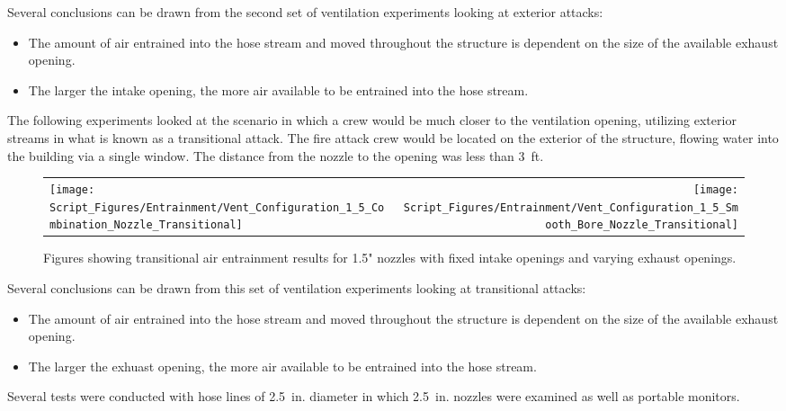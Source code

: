 \documentclass{article}
\begin{document}
Several conclusions can be drawn from the second set of ventilation experiments looking at exterior attacks:

\begin{itemize}
	\item The amount of air entrained into the hose stream and moved throughout the structure is dependent on the size of the available exhaust opening.
	\item The larger the intake opening, the more air available to be entrained into the hose stream.
\end{itemize}

\clearpage

The following experiments looked at the scenario in which a crew would be much closer to the ventilation opening, utilizing exterior streams in what is known as a transitional attack. The fire attack crew would be located on the exterior of the structure, flowing water into the building via a single window. The distance from the nozzle to the opening was less than 3~ft.

\begin{figure}[!ht]
\begin{tabular*}{\textwidth}{lr}
\texttt{[image: Script\_Figures/Entrainment/Vent\_Configuration\_1\_5\_Combination\_Nozzle\_Transitional]} &
\texttt{[image: Script\_Figures/Entrainment/Vent\_Configuration\_1\_5\_Smooth\_Bore\_Nozzle\_Transitional]} \\
\end{tabular*}
\caption{Figures showing transitional air entrainment results for 1.5" nozzles with fixed intake openings and varying exhaust openings.}
\label{fig:1_5_Transitional_Vents}
\end{figure}

Several conclusions can be drawn from this set of ventilation experiments looking at transitional attacks:

\begin{itemize}
	\item The amount of air entrained into the hose stream and moved throughout the structure is dependent on the size of the available exhaust opening.
	\item The larger the exhuast opening, the more air available to be entrained into the hose stream.
\end{itemize}

\clearpage

Several tests were conducted with hose lines of 2.5~in. diameter in which 2.5~in. nozzles were examined as well as portable monitors.
\end{document}
